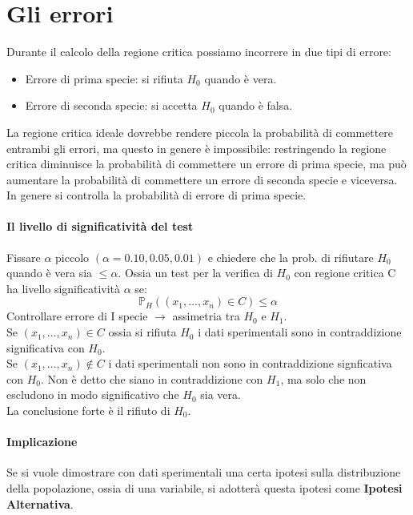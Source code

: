\section{Gli errori}
Durante il calcolo della regione critica possiamo incorrere in due tipi di errore:
\begin{itemize}
    \item Errore di prima specie: si rifiuta $H_0$ quando è vera.
    \item Errore di seconda specie: si accetta $H_0$ quando è falsa.
\end{itemize}
La regione critica ideale dovrebbe rendere piccola la probabilità di commettere
entrambi gli errori, ma questo in genere è impossibile: restringendo la regione
critica diminuisce la probabilità di commettere un errore di prima specie, ma
può aumentare la probabilità di commettere un errore di seconda specie e viceversa.
\\In genere si controlla la probabilità di errore di prima specie.

\paragraph{Il livello di significatività del test} 
Fissare $\alpha$ piccolo $(\alpha = 0.10, 0.05, 0.01)$ e chiedere che la prob. di rifiutare $H_0$ quando è
vera sia $\leq \alpha$. Ossia un test per la verifica di $H_0$ con regione critica C
ha livello significatività $\alpha$ se:
\begin{equation}
    \mathbb{P}_H((x_1, ..., x_n)\in C) \leq \alpha
\end{equation}
Controllare errore di I specie $\rightarrow$ assimetria tra $H_0$ e $H_1$.
\\ Se $(x_1, ..., x_n) \in C$ ossia si rifiuta $H_0$ i dati sperimentali sono
in contraddizione significativa con $H_0$.
\\ Se $(x_1, ..., x_n) \notin C$ i dati sperimentali non sono
in contraddizione signficativa con $H_0$.
Non è detto che siano in contraddizione con $H_1$, ma solo che non escludono
in modo significativo che $H_0$ sia vera.
\\ La conclusione forte è il rifiuto di $H_0$.
\paragraph*{Implicazione} Se si vuole dimostrare con dati sperimentali una certa ipotesi
sulla distribuzione della popolazione, ossia di una variabile, si adotterà questa
ipotesi come \textbf{Ipotesi Alternativa}.

